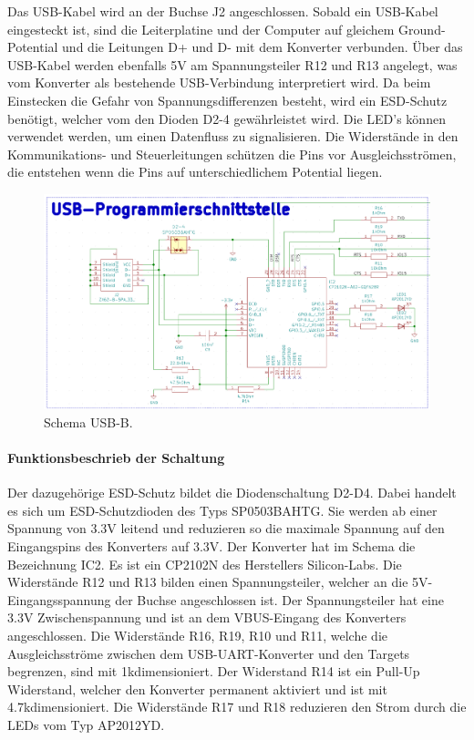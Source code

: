 Das USB-Kabel wird an der Buchse J2 angeschlossen. Sobald ein USB-Kabel eingesteckt ist, sind die Leiterplatine und der Computer auf gleichem Ground-Potential und die Leitungen D+ und D- mit dem Konverter verbunden. Über das USB-Kabel werden ebenfalls 5V am Spannungsteiler R12 und R13 angelegt, was vom Konverter als bestehende USB-Verbindung interpretiert wird. Da beim Einstecken die Gefahr von Spannungsdifferenzen besteht, wird ein ESD-Schutz benötigt, welcher vom den Dioden D2-4 gewährleistet wird. Die LED's können verwendet werden, um einen Datenfluss zu signalisieren. Die Widerstände in den Kommunikations- und Steuerleitungen schützen die Pins vor Ausgleichsströmen, die entstehen wenn die Pins auf unterschiedlichem Potential liegen.
\begin{figure}[h!]
	\centering
	\includegraphics[width=1\textwidth]{graphics/Schema_USB_B}
	\caption{Schema USB-B.}
	\label{fig:Schema_USB_B}
\end{figure}
\newpage
\paragraph{Funktionsbeschrieb der Schaltung}\mbox{}

Der dazugehörige ESD-Schutz bildet die Diodenschaltung D2-D4. Dabei handelt es sich um ESD-Schutzdioden des Typs SP0503BAHTG. Sie werden ab einer Spannung von 3.3V leitend und reduzieren so die maximale Spannung auf den Eingangspins des Konverters auf 3.3V. Der Konverter hat im Schema die Bezeichnung IC2. Es ist ein CP2102N des Herstellers Silicon-Labs. Die Widerstände R12 und R13 bilden einen Spannungsteiler, welcher an die 5V-Eingangsspannung der Buchse angeschlossen ist. Der Spannungsteiler hat eine 3.3V Zwischenspannung und ist an dem VBUS-Eingang des Konverters angeschlossen. Die Widerstände R16, R19, R10 und R11, welche die Ausgleichsströme zwischen dem USB-UART-Konverter und den Targets begrenzen, sind mit 1k\textOmega dimensioniert. Der Widerstand R14 ist ein Pull-Up Widerstand, welcher den Konverter permanent aktiviert und ist mit 4.7k\textOmega dimensioniert. Die Widerstände R17 und R18 reduzieren den Strom durch die LEDs vom Typ AP2012YD.